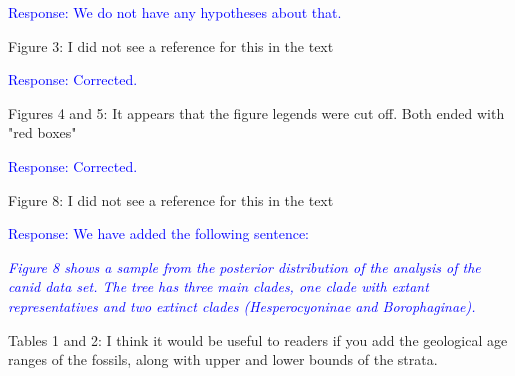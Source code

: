 \documentclass[11pt]{article}
\newcommand{\response}[1]{\medskip{}\textcolor{blue}{{Response: #1}}\medskip{}}
\newcommand{\respquote}[1]{{\medskip{}\textcolor{blue}{{\it #1}}\medskip{}}}
\begin{document}
\response{We do not have any hypotheses about that.}

Figure 3: I did not see a reference for this in the text

\response{Corrected.}

Figures 4 and 5: It appears that the figure legends were cut off. Both ended with "red boxes"

\response{Corrected.}

Figure 8: I did not see a reference for this in the text

\response{We have added the following sentence:}

\respquote{Figure 8 shows a sample from the posterior distribution of the analysis of the canid data set. The tree has three main clades, one clade with extant representatives and two extinct clades ({\it Hesperocyoninae} and {\it Borophaginae}). 
}

Tables 1 and 2: I think it would be useful to readers if you add the geological age ranges of the fossils, along with upper and lower bounds of the strata.




\end{document}
